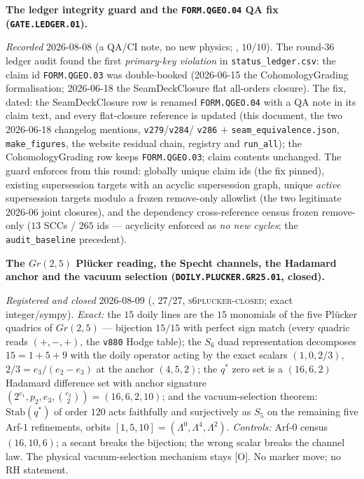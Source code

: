 \par\smallskip\noindent\textbf{The ledger integrity guard and
the \texttt{FORM.QGEO.04} QA fix (\texttt{GATE.LEDGER.01}).}
{\sloppy
\emph{Recorded} 2026-08-08 (a QA/CI note, no new physics;
, $10/10$).  The round-36
ledger audit found the first \emph{primary-key violation} in
\texttt{status\_ledger.csv}: the claim id \texttt{FORM.QGEO.03}
was double-booked (2026-06-15 the CohomologyGrading
formalisation; 2026-06-18 the SeamDeckClosure flat all-orders
closure).  The fix, dated: the SeamDeckClosure row is renamed
\texttt{FORM.QGEO.04} with a QA note in its claim text, and
every flat-closure reference is updated (this document, the two
2026-06-18 changelog mentions, \texttt{v279}/\texttt{v284}/%
\texttt{v286} $+$ \texttt{seam\_equivalence.json},
\texttt{make\_figures}, the website residual chain, registry
and \texttt{run\_all}); the CohomologyGrading row keeps
\texttt{FORM.QGEO.03}; claim contents unchanged.  The guard
enforces from this round: globally unique claim ids (the fix
pinned), existing supersession targets with an acyclic
supersession graph, unique \emph{active} supersession targets
modulo a frozen remove-only allowlist (the two legitimate
2026-06 joint closures), and the dependency cross-reference
census frozen remove-only ($13$ SCCs / $265$ ids ---
acyclicity enforced as \emph{no new cycles}; the
\texttt{audit\_baseline} precedent).\par}

\par\smallskip\noindent\textbf{The $Gr(2,5)$ Pl\"ucker reading,
the Specht channels, the Hadamard anchor and the vacuum
selection (\texttt{DOILY.PLUCKER.\allowbreak GR25.01},
closed).}
{\sloppy
\emph{Registered and closed} 2026-08-09
(, $27/27$,
\textsc{s6plucker-closed}; exact integer/sympy).  \emph{Exact:}
the $15$ doily lines are the $15$ monomials of the five
Pl\"ucker quadrics of $Gr(2,5)$ --- bijection $15/15$ with
perfect sign match (every quadric reads $(+,-,+)$, the
\texttt{v880} Hodge table); the $S_6$ duad representation
decomposes $15 = 1 + 5 + 9$ with the doily operator acting by
the exact scalars $(1, 0, 2/3)$, $2/3 = e_3/(e_2 - e_3)$ at the
anchor $(4, 5, 2)$; the $q^{*}$ zero set is a $(16, 6, 2)$
Hadamard difference set with anchor signature $(2^{e_1}, p_2,
e_3, \binom{e_2}{2}) = (16, 6, 2, 10)$; and the
vacuum-selection theorem: $\mathrm{Stab}(q^{*})$ of order $120$
acts faithfully and surjectively as $S_5$ on the remaining five
Arf-$1$ refinements, orbits $[1, 5, 10] = (\Lambda^0,
\Lambda^4, \Lambda^2)$.  \emph{Controls:} Arf-$0$ census
$(16,10,6)$; a secant breaks the bijection; the wrong scalar
breaks the channel law.  The physical vacuum-selection
mechanism stays [O].  No marker move; no RH statement.\par}

